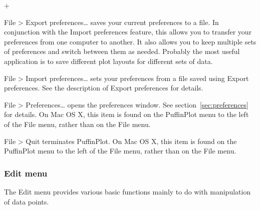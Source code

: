 \documentclass[a4paper,british]{article}
\newcommand{\menuitemlabel}[1]{%
\mbox{\textsf{#1}}\hfil}
\newenvironment{menuitemlist}%
{\begin{list}{}{%
\renewcommand{\makelabel}{\menuitemlabel}%
\setlength{\labelwidth}{35pt}%
\setlength{\leftmargin}%
             {\labelwidth+\labelsep}}}%
{\end{list}}
\newcommand{\ppcmd}[1]{\textsf{#1}} %
\newcommand{\submenu}{ \textgreater{} } %
\begin{document}
\begin{menuitemlist}
\item[File\submenu Export preferences\ldots] saves your current preferences to
a file. In conjunction with the \ppcmd{Import preferences} feature, this
allows you to transfer your preferences from one computer to another. It also
allows you to keep multiple sets of preferences and switch between them as
needed. Probably the most useful application is to save different plot
layouts for different sets of data.

\item[File\submenu Import preferences\ldots] sets your preferences from
a file saved using \ppcmd{Export preferences}. See the description of
\ppcmd{Export preferences} for details.

\item[File\submenu Preferences\ldots] opens the preferences window. See
section~\ref{sec:preferences} for details. On Mac OS X, this item is
found on the \ppcmd{PuffinPlot} menu to the left of the \ppcmd{File} menu,
rather than on the \ppcmd{File} menu.

\item[File\submenu Quit] terminates PuffinPlot. On Mac OS X, this item is
found on the \ppcmd{PuffinPlot} menu to the left of the \ppcmd{File} menu,
rather than on the \ppcmd{File} menu.

\end{menuitemlist}

\subsubsection{Edit menu}

The \ppcmd{Edit} menu provides various basic functions mainly
to do with manipulation of data points.
\end{document}
